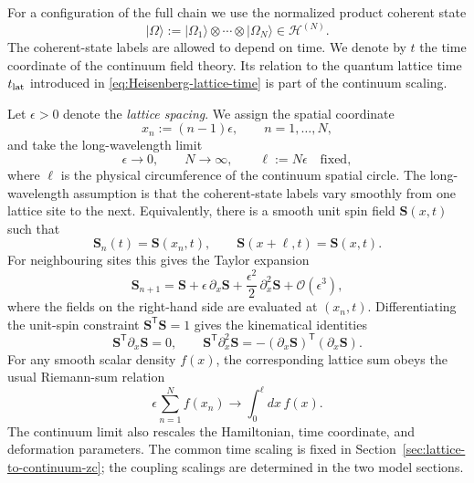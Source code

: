 For a configuration of the full chain we use the normalized product coherent
state
\begin{equation}
|\Omega\rangle
:=
|\Omega_1\rangle\otimes\cdots\otimes|\Omega_N\rangle
\in\mathcal H^{(N)}.
\label{eq:product-coherent-state}
\end{equation}
The coherent-state labels are allowed to depend on time.  We denote by $t$ the
time coordinate of the continuum field theory.  Its relation to the quantum
lattice time $t_{\rm lat}$ introduced in \eqref{eq:Heisenberg-lattice-time}
is part of the continuum scaling.

Let $\epsilon>0$ denote the \emph{lattice spacing}.  We assign the spatial
coordinate
\begin{equation}
x_n:=(n-1)\epsilon,
\qquad n=1,\ldots,N,
\label{eq:lattice-coordinate}
\end{equation}
and take the long-wavelength limit
\begin{equation}
\epsilon\to0,
\qquad
N\to\infty,
\qquad
\ell:=N\epsilon\quad\text{fixed},
\label{eq:long-wavelength-limit}
\end{equation}
where $\ell$ is the physical circumference of the continuum spatial circle.
The long-wavelength assumption is that the coherent-state labels vary
smoothly from one lattice site to the next.  Equivalently, there is a smooth
unit spin field $\boldsymbol S(x,t)$ such that
\begin{equation}
\boldsymbol S_n(t)=\boldsymbol S(x_n,t),
\qquad
\boldsymbol S(x+\ell,t)=\boldsymbol S(x,t).
\label{eq:continuum-spin-field}
\end{equation}
For neighbouring sites this gives the Taylor expansion
\begin{equation}
\boldsymbol S_{n+1}
=
\boldsymbol S
+\epsilon\,\partial_x\boldsymbol S
+\frac{\epsilon^2}{2}\,\partial_x^2\boldsymbol S
+\mathcal O(\epsilon^3),
\label{eq:spin-long-wavelength-expansion}
\end{equation}
where the fields on the right-hand side are evaluated at $(x_n,t)$.
Differentiating the unit-spin constraint
$\boldsymbol S^{\mathsf T}\boldsymbol S=1$ gives the kinematical identities
\begin{equation}
\boldsymbol S^{\mathsf T}\partial_x\boldsymbol S=0,
\qquad
\boldsymbol S^{\mathsf T}\partial_x^2\boldsymbol S
=-(\partial_x\boldsymbol S)^{\mathsf T}(\partial_x\boldsymbol S).
\label{eq:spin-kinematical-identities}
\end{equation}
For any smooth scalar density $f(x)$, the corresponding lattice sum obeys the
usual Riemann-sum relation
\begin{equation}
\epsilon\sum_{n=1}^{N}f(x_n)
\longrightarrow
\int_0^{\ell}dx\,f(x).
\label{eq:riemann-sum-continuum}
\end{equation}
The continuum limit also rescales the Hamiltonian, time coordinate, and
deformation parameters.  The common time scaling is fixed in
Section~\ref{sec:lattice-to-continuum-zc}; the coupling scalings are
determined in the two model sections.


